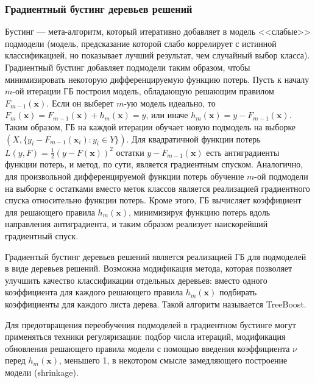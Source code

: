 \subsubsection{Градиентный бустинг деревьев решений}
Бустинг --- мета-алгоритм, который итеративно добавляет в модель <<слабые>> подмодели (модель, предсказание которой слабо коррелирует с истинной классификацией, но показывает лучший результат, чем случайный выбор класса). Градиентный бустинг добавляет подмодели таким образом, чтобы минимизировать некоторую дифференцируемую функцию потерь. Пусть к началу \(m\)-ой итерации ГБ построил модель, обладающую решающим правилом \(F_{m-1}(\mathbf{x})\). Если он выберет \(m\)-ую модель идеально, то \(F_{m}(\mathbf{x})=F_{m-1}(\mathbf{x}) + h_m(\mathbf{x})=y\), или иначе \(h_m(\mathbf{x})=y-F_{m-1}(\mathbf{x})\). Таким образом, ГБ на каждой итерации обучает новую подмодель на выборке \(\left(X, \{y_i-F_{m-1}(\mathbf{x}_i):y_i\in Y\}\right)\). Для квадратичной функции потерь \(L\left(y, F\right)=\frac12 \left(y-F(\mathbf{x})\right)^2\) остатки \(y-F_{m-1}(\mathbf{x})\) есть антиградиенты функции потерь, и метод, по сути, является градиентным спуском. Аналогично, для произвольной дифференцируемой функции потерь обучение \(m\)-ой подмодели на выборке с остатками вместо меток классов является реализацией градиентного спуска относительно функции потерь. Кроме этого, ГБ вычисляет коэффициент для решающего правила \(h_m(\mathbf{x})\), минимизируя функцию потерь вдоль направления антиградиента, и таким образом реализует наискорейший градиентный спуск.

Градиентый бустинг деревьев решений является реализацией ГБ для подмоделей в виде деревьев решений. Возможна модификация метода, которая позволяет улучшить качество классификации отдельных деревьев: вместо одного коэффициента для каждого решающего правила \(h_m(\mathbf{x})\) подбирать коэффициенты для каждого листа дерева. Такой алгоритм называется TreeBoost.

Для предотвращения переобучения подмоделей в градиентном бустинге могут применяться техники регуляризации: подбор числа итераций, модификация обновления решающего правила модели с помощью введения коэффициента \(\nu\) перед \(h_m(\mathbf{x})\), меньшего 1, в некотором смысле замедляющего построение модели (shrinkage).

